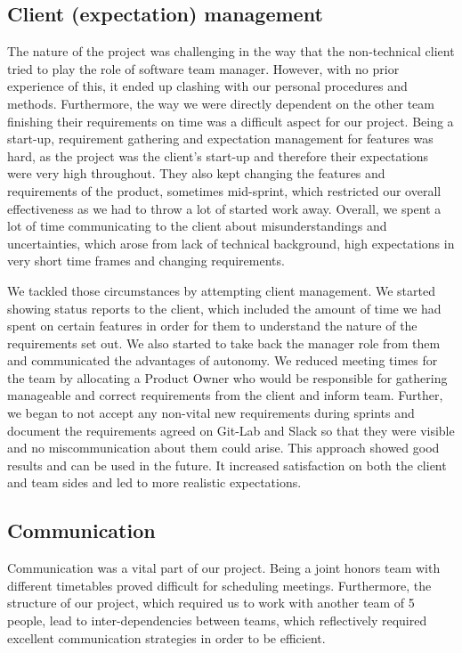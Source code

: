 \documentclass{l3proj}
\begin{document}
\subsection{Client (expectation) management}
The nature of the project was challenging in the way that the non-technical client tried to play the role of software team manager. However, with no prior experience of this, it ended up clashing with our personal procedures and methods. Furthermore, the way we were directly dependent on the other team finishing their requirements on time was a difficult aspect for our project. Being a start-up, requirement gathering and expectation management for features was hard, as the project was the client’s start-up and therefore their expectations were very high throughout. They also kept changing the features and requirements of the product, sometimes mid-sprint, which restricted our overall effectiveness as we had to throw a lot of started work away. Overall, we spent a lot of time communicating to the client about misunderstandings and uncertainties, which arose from lack of technical background, high expectations in very short time frames and changing requirements. 

We tackled those circumstances by attempting client management. We started showing status reports to the client, which included the amount of time we had spent on certain features in order for them to understand the nature of the requirements set out. We also started to take back the manager role from them and communicated the advantages of autonomy. We reduced meeting times for the team by allocating a Product Owner who would be responsible for gathering manageable and correct requirements from the client and inform team. Further, we began to not accept any non-vital new requirements during sprints and document the requirements agreed on Git-Lab and Slack so that they were visible and no miscommunication about them could arise. This approach showed good results and can be used in the future. It increased satisfaction on both the client and team sides and led to more realistic expectations.

\subsection{Communication}
Communication was a vital part of our project. Being a joint honors team with different timetables proved difficult for scheduling meetings. Furthermore, the structure of our project, which required us to work with another team of 5 people, lead to inter-dependencies between teams, which reflectively required excellent communication strategies in order to be efficient.  
\end{document}
